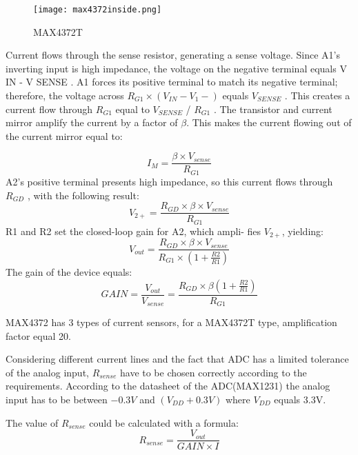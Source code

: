  \begin{figure}[h]
 	\centering
 	\texttt{[image: max4372inside.png]}
 	\caption{MAX4372T \cite{24}}
 	\label{fig: max4372t_inside}
 \end{figure} 
 
 \newpage
 

 Current flows through the sense resistor, generating a sense voltage.  Since A1’s inverting input is high impedance, the voltage on the negative terminal equals V IN - V SENSE \cite{23}. A1 forces its
positive terminal to match its negative terminal; therefore, the voltage across $R_{G1}\times (V_{IN} - V_{1}-)$ equals $V_{SENSE}$ . This
creates a current flow through $R_{G1}$ equal to $V_{SENSE}$ /
$R_{G1}$ . The transistor and current mirror amplify the current
by a factor of $\beta$. This makes the current flowing out of the
current mirror equal to: 

 \begin{equation}
I_{M} = \frac{\beta \times V_{sense}}{R_{G1}}
 \end{equation}
 A2’s positive terminal presents high impedance, so this
 current flows through $R_{GD}$ , with the following result:
  \begin{equation}
V_{2+} = \frac{R_{GD} \times \beta \times V_{sense}}{R_{G1}}
  \end{equation}
  R1 and R2 set the closed-loop gain for A2, which ampli-
  fies $V_{2+}$, yielding:
  \begin{equation}
  V_{out} = \frac{R_{GD} \times \beta \times V_{sense}}{R_{G1} \times (1+\frac{R2}{R1})	 }
  \end{equation}
The gain of the device equals:
  \begin{equation}
  GAIN =\frac{V_{out}}{V_{sense}} = \frac{R_{GD} \times \beta (1+\frac{R2}{R1})}{R_{G1}}
  \end{equation}
  
  MAX4372 has 3 types of current sensors, for a MAX4372T type, amplification factor equal 20.
  
  Considering different current lines and the fact that ADC has a limited tolerance of the analog input, $R_{sense}$ have to be chosen correctly according to the requirements. According to the datasheet of the ADC(MAX1231) the analog input has to be between $ -0.3V$ and $(V_{DD} + 0.3V)$ where $V_{DD}$ equals 3.3V.
  
  The value of $R_{sense}$ could be calculated with a formula:
    \begin{equation}
    R_{sense} = \frac{V_{out}}{GAIN \times I}
    \end{equation}
  
